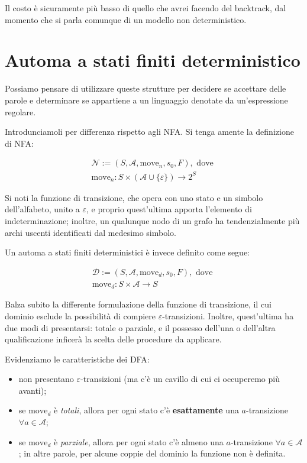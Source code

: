\documentclass[class=book, crop=false, oneside, 12pt]{standalone}
\begin{document}
Il costo è sicuramente più basso di quello che avrei facendo del backtrack, dal momento che si parla comunque di un modello non deterministico. 

\section{Automa a stati finiti deterministico}
Possiamo pensare di utilizzare queste strutture per decidere se accettare delle parole e determinare se appartiene a un linguaggio denotate da un'espressione regolare.

Introdunciamoli per differenza rispetto agli NFA. Si tenga  amente la definizione di NFA:

\begin{gather*}
    \mathcal{N} := (S, \mathcal{A}, \textrm{move}_n, s_0, F), \textrm{ dove } \\
    \textrm{move}_n : S \times (\mathcal{A} \cup \{\varepsilon\}) \to 2^S
\end{gather*}

Si noti la funzione di transizione, che opera con uno stato e un simbolo dell'alfabeto, unito a \(\varepsilon\), e proprio quest'ultima apporta l'elemento di indeterminazione; inoltre, un qualunque nodo di un grafo ha tendenzialmente più archi uscenti identificati dal medesimo simbolo.

Un automa a stati finiti deterministici è invece definito come segue:

\begin{gather*}
    \mathcal{D} := (S, \mathcal{A}, \textrm{move}_d, s_0, F), \textrm{ dove } \\
    \textrm{move}_d : S \times \mathcal{A} \to S
\end{gather*}

Balza subito la differente formulazione della funzione di transizione, il cui dominio esclude la possibilità di compiere \(\varepsilon\)-transizioni. Inoltre, quest'ultima ha due modi di presentarsi: totale o parziale, e il possesso dell'una o dell'altra qualificazione inficerà la scelta delle procedure da applicare.

Evidenziamo le caratteristiche dei DFA:

\begin{itemize}
    \item non presentano \(\varepsilon\)-transizioni (ma c'è un cavillo di cui ci occuperemo più avanti);
    \item se \(\textrm{move}_d\) è \emph{totali}, allora per ogni stato c'è \textbf{esattamente} una \(a\)-transizione \(\forall a \in \mathcal{A}\);
    \item se \(\textrm{move}_d\) è \emph{parziale}, allora per ogni stato c'è \textrm{almeno} una \(a\)-transizione \(\forall a \in \mathcal{A}\); in altre parole, per alcune coppie del dominio la funzione non è definita.
\end{itemize}
\end{document}
